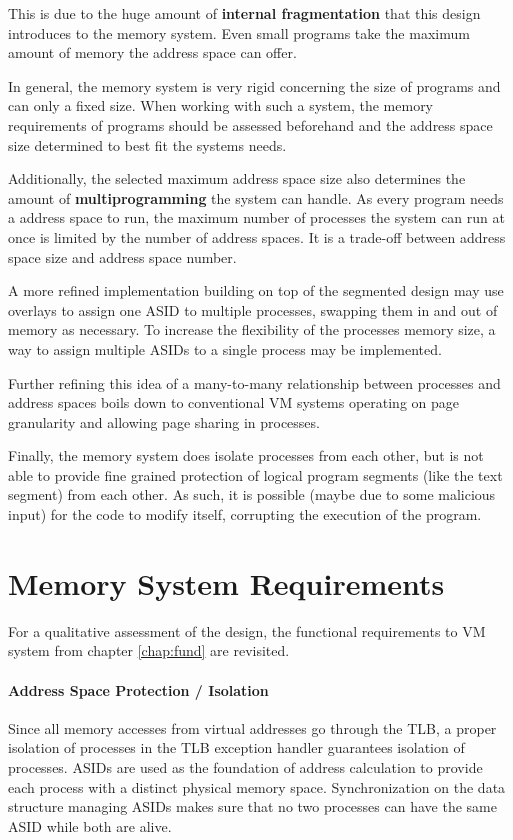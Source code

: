 This is due to the huge amount of \textbf{internal fragmentation} that this design introduces to the memory system. Even small programs take the maximum amount of memory the address space can offer.

In general, the memory system is very rigid concerning the size of programs and can only a fixed size. When working with such a system, the memory requirements of programs should be assessed beforehand and the address space size determined to best fit the systems needs.

Additionally, the selected maximum address space size also determines the amount of \textbf{multiprogramming} the system can handle. As every program needs a address space to run, the maximum number of processes the system can run at once is limited by the number of address spaces.
It is a trade-off between address space size and address space number.

A more refined implementation building on top of the segmented design may use overlays \cite{tanenbaumOS} to assign one ASID to multiple processes, swapping them in and out of memory as necessary. To increase the flexibility of the processes memory size, a way to assign multiple ASIDs to a single process may be implemented.

Further refining this idea of a many-to-many relationship between processes and address spaces boils down to conventional VM systems operating on page granularity and allowing page sharing in processes.

Finally, the memory system does isolate processes from each other, but is not able to provide fine grained protection of logical program segments (like the text segment) from each other. As such, it is possible (maybe due to some malicious input) for the code to modify itself, corrupting the execution of the program.

\section{Memory System Requirements}
For a qualitative assessment of the design, the functional requirements to VM system from chapter \ref{chap:fund} are revisited.

\paragraph{Address Space Protection / Isolation} Since all memory accesses from virtual addresses go through the TLB, a proper isolation of processes in the TLB exception handler guarantees isolation of processes. ASIDs are used as the foundation of address calculation to provide each process with a distinct physical memory space.
Synchronization on the data structure managing ASIDs makes sure that no two processes can have the same ASID while both are alive.

